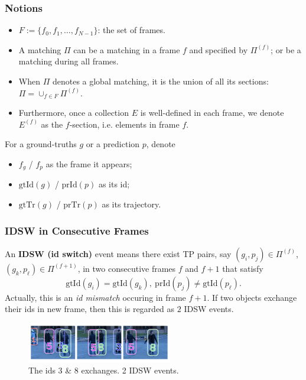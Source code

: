 \documentclass[slidetop, mathserif]{beamer}
\begin{document}
\begin{frame}
	\frametitle{Notions}
			
	\begin{itemize}
		\item $F:=\{f_0, f_1, \ldots, f_{N-1}\}$: the set of frames.
		\item A matching $\Pi$ can be a matching in a frame $f$ and specified by $\Pi^{(f)}$;
		      or be a matching during all frames.
		\item When $\Pi$ denotes a global matching, it is the union of all its sections:
		      $\Pi = \cup_{f\in F}\Pi^{(f)}$.
		\item Furthermore, once a collection $E$ is well-defined in each frame,
		      we denote $E^{(f)}$ as the $f$-section, i.e. elements in frame $f$.
		      		      		      
	\end{itemize}
			
	\vspace{-5pt}

	For a ground-truths $g$ or a prediction $p$, denote
	\begin{itemize}
		\item $f_g$ / $f_p$ as the frame it appears;
		\item $\text{gtId}(g)$ / $\text{prId}(p)$ as its id;
		\item $\text{gtTr}(g)$ / $\text{prTr}(p)$ as its trajectory.
	\end{itemize}

\end{frame}

\begin{frame}
	\frametitle{IDSW in Consecutive Frames}
			
	An {\bf IDSW (id switch)} event means there exist TP pairs, say $(g_i, p_j)\in\Pi^{(f)}$,
	$(g_k, p_\ell)\in\Pi^{(f+1)}$, in two consecutive frames
	$f$ and $f+1$ that satisfy
	\[
		\text{gtId}(g_i) = \text{gtId}(g_k),\ 
		\text{prId}(p_j) \neq \text{gtId}(p_\ell).
	\]
	Actually, this is an \emph{id mismatch} occuring in frame $f+1$.
	If two objects exchange their ids in new frame, then this is regarded as $2$
	IDSW events.
	\begin{figure}
		\includegraphics[width=180pt]{pics/fig3.png}
		\caption{The ids 3 \& 8 exchanges. 2 IDSW events.}
	\end{figure}
			    
\end{frame}
\end{document}
